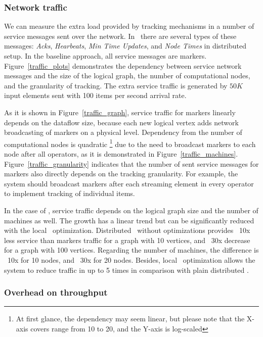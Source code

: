 \subsubsection{Network traffic}
\label{exp_network_traffic}

We can measure the extra load provided by tracking mechanisms in a number of service messages sent over the network. In \tracker\ there are several types of these messages: {\em Acks}, {\em Hearbeats}, {\em Min Time Updates}, and {\em Node Times} in distributed setup. In the baseline approach, all service messages are markers. Figure~\ref{traffic_plots} demonstrates the dependency between service network messages and the size of the logical graph, the number of computational nodes, and the granularity of tracking. The extra service traffic is generated by $50K$ input elements sent with 100 items per second arrival rate. 

As it is shown in Figure~\ref{traffic_graph}, service traffic for markers linearly depends on the dataflow size, because each new logical vertex adds network broadcasting of markers on a physical level. Dependency from the number of computational nodes is quadratic \footnote{At first glance, the dependency may seem linear, but please note that the X-axis covers range from 10 to 20, and the Y-axis is log-scaled} due to the need to broadcast markers to each node after all operators, as it is demonstrated in Figure~\ref{traffic_machines}. Figure~\ref{traffic_granularity} indicates that the number of sent service messages for markers also directly depends on the tracking granularity. For example, the system should broadcast markers after each streaming element in every operator to implement tracking of individual items. 

In the case of \tracker , service traffic depends on the logical graph size and the number of machines as well. The growth has a linear trend but can be significantly reduced with the local \tracker\ optimization. Distributed \tracker\ without optimizations provides ~10x less service than markers traffic for a graph with 10 vertices, and ~30x decrease for a graph with 100 vertices. Regarding the number of machines, the difference is ~10x for 10 nodes, and ~30x for 20 nodes. Besides, local \tracker\ optimization allows the system to reduce traffic in up to 5 times in comparison with plain distributed \tracker .

\subsubsection{Overhead on throughput}
\label{overhead_throughput}

